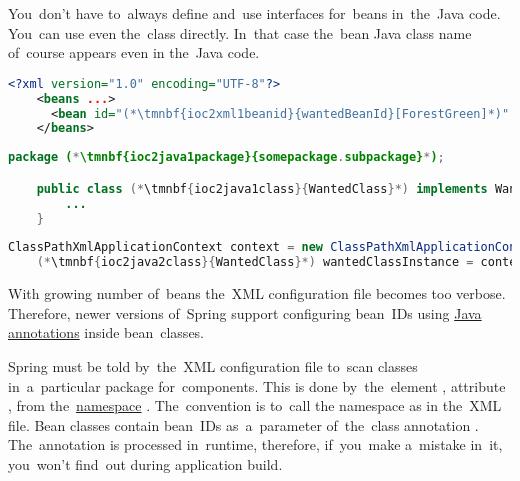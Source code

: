 \note You~don't have to~always define and~use interfaces for~beans in~the~Java code.
You~can use even the~class directly.
In~that case the~bean Java class name of~course appears even in the~Java code.
\newpage

\begin{lstlisting}[language=XML, title={Configuration XML}]
    <?xml version="1.0" encoding="UTF-8"?>
    <beans ...>
      <bean id="(*\tmnbf{ioc2xml1beanid}{wantedBeanId}[ForestGreen]*)" class="(*\tmnbf{ioc2xml1package}{somepackage.subpackage}[ForestGreen]*).(*\tmnbf{ioc2xml1class}{WantedClass}[ForestGreen]*)"/>
    </beans>
\end{lstlisting}
\begin{lstlisting}[language=Java, title={Wanted class}]
    package (*\tmnbf{ioc2java1package}{somepackage.subpackage}*);

    public class (*\tmnbf{ioc2java1class}{WantedClass}*) implements WantedClassInterface {
        ...
    }
\end{lstlisting}
\begin{lstlisting}[language=Java, title={Usage}]
    ClassPathXmlApplicationContext context = new ClassPathXmlApplicationContext("configurationFile.xml");
    (*\tmnbf{ioc2java2class}{WantedClass}*) wantedClassInstance = context.getBean("(*\tmnbf{ioc2java2beanid}{wantedBeanId}[ForestGreen]*)", (*\tmnbf{ioc2java2class2}{WantedClass}*).class);
\end{lstlisting}

\label{iocannotations}
With growing number of~beans the~XML configuration file becomes too verbose.
Therefore, newer versions of~Spring support configuring bean~IDs using \hyperref[javaannotation]{Java annotations} inside bean~classes.

Spring must be told by~the~XML configuration file to~scan classes in~a~particular package for~components.
This is done by~the~element , attribute , from the~\hyperref[namespace]{namespace} .
The~convention is to~call the namespace as  in the~XML file.
Bean classes contain bean~IDs as~a~parameter of~the~class annotation .
The~annotation is processed in~runtime, therefore, if~you~make a~mistake in~it, you~won't find~out during application build.

